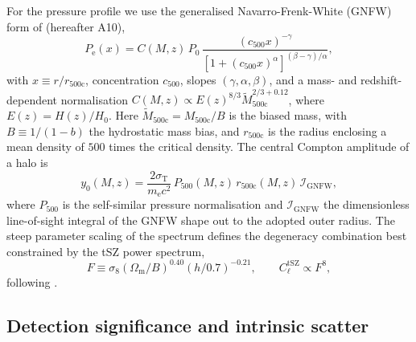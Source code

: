 \documentclass[aps,prd,twocolumn,superscriptaddress,nofootinbib,floatfix]{revtex4-2}
\begin{document}
For the pressure profile we use the generalised Navarro-Frenk-White (GNFW) form of \citet{Arnaud_2010} (hereafter A10),
\begin{equation}
    P_{\mathrm{e}}(x) = C(M,z)\, P_0 \,
    \frac{(c_{500}x)^{-\gamma}}
    {\left[1 + (c_{500}x)^\alpha\right]^{(\beta-\gamma)/\alpha}},
    \label{eq:gnfw}
\end{equation}
with $x \equiv r/r_{500\mathrm{c}}$, concentration $c_{500}$, slopes $(\gamma, \alpha, \beta)$, and a mass- and redshift-dependent normalisation $C(M,z) \propto E(z)^{8/3} \tilde M_{500\mathrm{c}}^{2/3 + 0.12}$, where $E(z) = H(z)/H_0$.
Here $\tilde M_{500\mathrm{c}} = M_{500\mathrm{c}} / B$ is the biased mass, with $B \equiv 1/(1-b)$ the hydrostatic mass bias, and $r_{500\mathrm{c}}$ is the radius enclosing a mean density of $500$ times the critical density.
The central Compton amplitude of a halo is
\begin{equation}
    y_0(M,z) = \frac{2\sigma_{\mathrm{T}}}{m_{\mathrm{e}} c^2}\,
    P_{500}(M,z)\, r_{500\mathrm{c}}(M,z)\, \mathcal{I}_{\mathrm{GNFW}},
    \label{eq:y0}
\end{equation}
where $P_{500}$ is the self-similar pressure normalisation and $\mathcal{I}_{\mathrm{GNFW}}$ the dimensionless line-of-sight integral of the GNFW shape out to the adopted outer radius.
The steep parameter scaling of the spectrum defines the degeneracy combination best constrained by the tSZ power spectrum,
\begin{equation}
    F \equiv \sigma_8 \left(\Omega_{\mathrm{m}}/B\right)^{0.40} (h/0.7)^{-0.21},
    \qquad C_\ell^{\mathrm{tSZ}} \propto F^{8},
    \label{eq:F_def}
\end{equation}
following \citet{Bolliet:2017lha}.

\subsection{Detection significance and intrinsic scatter}
\label{sec:snr}
\end{document}

